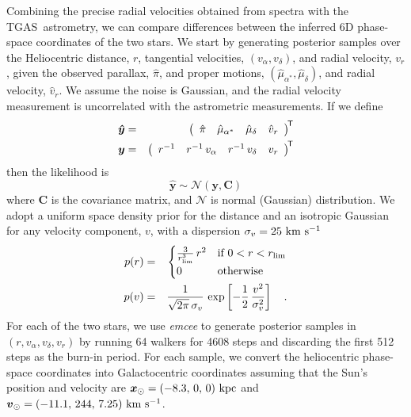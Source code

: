 \documentclass[12pt,letterpaper,margin=1in]{article}
\newcommand{\project}[1]{\textsl{#1}}
\newcommand{\acronym}[1]{{\small{#1}}}
\newcommand{\tgas}{\acronym{TGAS}}
\newcommand{\transp}[1]{{#1}^{\!\mathsf{T}}}
\newcommand{\bs}[1]{\boldsymbol{#1}}
\newcommand{\mat}[1]{\mathbf{#1}}
\renewcommand{\vec}[1]{\bs{#1}}
\newcommand{\kms}{\ensuremath{\rm km~s^{-1}}}
\begin{document}
Combining the precise radial velocities obtained from spectra with the \tgas\
astrometry, we can compare differences between the inferred 6D phase-space
coordinates of the two stars.
We start by generating posterior samples over the Heliocentric distance, $r$,
tangential velocities, $(v_\alpha, v_\delta)$, and radial velocity, $v_r$,
given the observed parallax, $\hat\pi$, and proper motions,
$(\hat\mu_{\alpha^*}, \hat\mu_\delta)$, and radial velocity, $\hat v_r$.
We assume the noise is Gaussian, and the radial velocity measurement is
uncorrelated with the astrometric measurements.
If we define
\begin{eqnarray}
  \vec{\hat y} &=&
      \transp{\left(
        \begin{array}{c@{\hspace{1em}} c@{\hspace{1em}} c@{\hspace{1em}} c}
          \hat\pi &
          \hat\mu_{\alpha^*} &
          \hat\mu_\delta &
          \hat v_r
        \end{array}
      \right)}\\
  \vec{y} &=&
      \transp{\left(
        \begin{array}{c@{\hspace{1em}} c@{\hspace{1em}} c@{\hspace{1em}} c}
          r^{-1} &
          r^{-1}\,v_\alpha &
          r^{-1}\,v_\delta &
          v_r
        \end{array}
      \right)}
\end{eqnarray}
then the likelihood is
\begin{equation}
  \vec{\hat y} \sim \mathcal{N}(\vec{y}, \mat{C})
\end{equation} where $\mat{C}$ is the covariance matrix, and $\mathcal{N}$ is
normal (Gaussian) distribution.
We adopt a uniform space density prior for the distance and an isotropic
Gaussian for any velocity component, $v$, with a dispersion $\sigma_v=25~\kms$
\begin{eqnarray}
p(r) &=&
  \begin{cases}
    \frac{3}{r_{\rm lim}^3} \, r^2 & \text{if } 0 < r < r_{\rm lim}\\
    0              & \text{otherwise}
  \end{cases}\\
p(v) &=& \frac{1}{\sqrt{2\pi}\,\sigma_v} \,
  \exp\left[-\frac{1}{2} \, \frac{v^2}{\sigma_v^2} \right] \quad .
\end{eqnarray}
%
For each of the two stars, we use \project{emcee}\cite{2013PASP..125..306F}
to generate posterior samples in $(r, v_\alpha, v_\delta, v_r)$
by running 64 walkers for 4608 steps and discarding the first
512 steps as the burn-in period.
For each sample, we convert the heliocentric phase-space coordinates into
Galactocentric coordinates assuming that the Sun's position and velocity are
$\vec x_\odot = (-8.3,\,0,\,0)~{\rm kpc}$ and $\vec v_\odot =
(-11.1,\,244,\,7.25)~\kms$\cite{Schonrich:2010, Schonrich:2012}.
\end{document}
